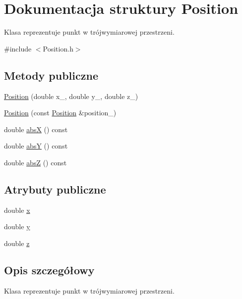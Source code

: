 \hypertarget{struct_position}{\section{Dokumentacja struktury Position}
\label{struct_position}
}


Klasa reprezentuje punkt w trójwymiarowej przestrzeni.  




{\ttfamily \#include $<$Position.\-h$>$}

\subsection*{Metody publiczne}
\begin{DoxyCompactItemize}
\item 
\hyperlink{struct_position_ae4b5a0536e6c0dab44457ff34b21ac50}{Position} (double x\-\_\-, double y\-\_\-, double z\-\_)
\item 
\hyperlink{struct_position_a46126c3ef1893b4581e4726ac33b557b}{Position} (const \hyperlink{struct_position}{Position} \&position\-\_\-)
\item 
double \hyperlink{struct_position_a29f0bd21850b275c2c107e8a238979db}{abs\-X} () const 
\item 
double \hyperlink{struct_position_a7c8267cc217b805e86691556f2232619}{abs\-Y} () const 
\item 
double \hyperlink{struct_position_a0176fb7d30f2fbb8cf8d4ba1242a4610}{abs\-Z} () const 
\end{DoxyCompactItemize}
\subsection*{Atrybuty publiczne}
\begin{DoxyCompactItemize}
\item 
double \hyperlink{struct_position_a9abbe738bad177de91fe4774099c1260}{x}
\item 
double \hyperlink{struct_position_a75f48c2a1d2c7131b8be1a0687ae72c8}{y}
\item 
double \hyperlink{struct_position_ab26043bc2f8f6094818c17dd44e43228}{z}
\end{DoxyCompactItemize}


\subsection{Opis szczegółowy}
Klasa reprezentuje punkt w trójwymiarowej przestrzeni. 

